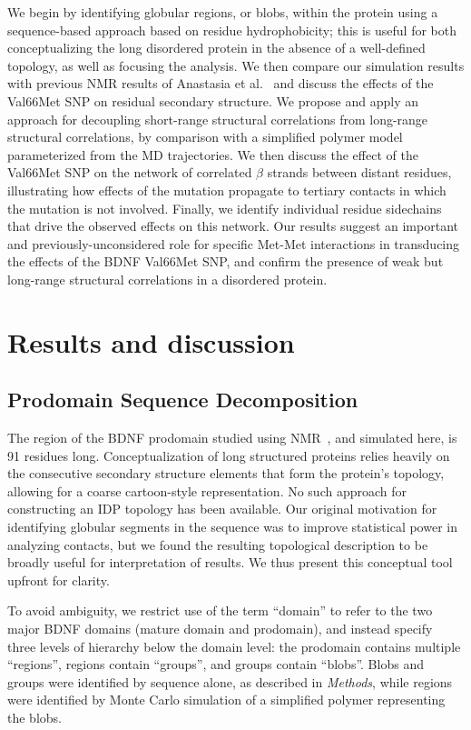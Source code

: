 \documentclass[10pt,letterpaper]{article}
\begin{document}
We begin by identifying globular regions, or blobs, within the protein using a sequence-based approach based on residue hydrophobicity; this is useful for both conceptualizing the long disordered protein in the absence of a well-defined topology, as well as focusing the analysis. We then compare our simulation results with previous NMR results of Anastasia et al.~\cite{Anastasia2013} and discuss the effects of the Val66Met SNP on residual secondary structure. We propose and apply an approach for decoupling short-range structural correlations from long-range structural correlations, by comparison with a simplified polymer model parameterized from the MD trajectories. We then discuss the effect of the Val66Met SNP on the network of correlated $\beta$ strands between distant residues, illustrating how effects of the mutation propagate to tertiary contacts in which the mutation is not involved. Finally, we identify individual residue sidechains that drive the observed effects on this network. Our results suggest an important and previously-unconsidered role for specific Met-Met interactions in transducing the effects of the BDNF Val66Met SNP, and confirm the presence of weak but long-range structural correlations in a disordered protein.


\section*{Results and discussion}
\subsection*{Prodomain Sequence Decomposition} 

The region of the BDNF prodomain studied using NMR~\cite{Anastasia2013}, and simulated here, is 91 residues long. Conceptualization of long structured proteins relies heavily on the consecutive secondary structure elements that form the protein's topology, allowing for a coarse cartoon-style representation. No such approach for constructing an IDP topology has been available. Our original motivation for identifying globular segments in the sequence was to improve statistical power in analyzing contacts, but we found the resulting topological description to be broadly useful for interpretation of results. We thus present this conceptual tool upfront for clarity. 

To avoid ambiguity, we restrict use of the term ``domain'' to refer to the two major BDNF domains (mature domain and prodomain), and instead specify three levels of hierarchy below the domain level: the prodomain contains multiple ``regions'', regions contain ``groups'', and groups contain ``blobs''. Blobs and groups were identified by sequence alone, as described in {\it Methods}, while regions were identified by Monte Carlo simulation of a simplified polymer representing the blobs.
 
\end{document}

